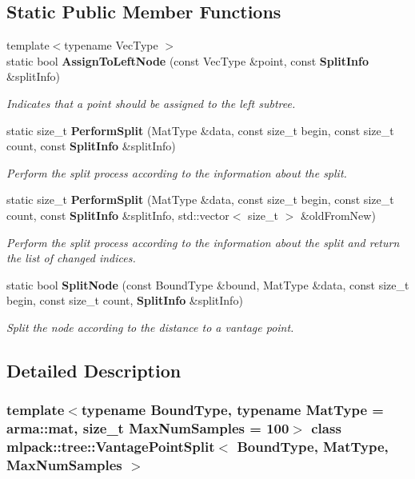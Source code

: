\subsection*{Static Public Member Functions}
\begin{DoxyCompactItemize}
\item 
{\footnotesize template$<$typename Vec\+Type $>$ }\\static bool \textbf{ Assign\+To\+Left\+Node} (const Vec\+Type \&point, const \textbf{ Split\+Info} \&split\+Info)
\begin{DoxyCompactList}\small\item\em Indicates that a point should be assigned to the left subtree. \end{DoxyCompactList}\item 
static size\+\_\+t \textbf{ Perform\+Split} (Mat\+Type \&data, const size\+\_\+t begin, const size\+\_\+t count, const \textbf{ Split\+Info} \&split\+Info)
\begin{DoxyCompactList}\small\item\em Perform the split process according to the information about the split. \end{DoxyCompactList}\item 
static size\+\_\+t \textbf{ Perform\+Split} (Mat\+Type \&data, const size\+\_\+t begin, const size\+\_\+t count, const \textbf{ Split\+Info} \&split\+Info, std\+::vector$<$ size\+\_\+t $>$ \&old\+From\+New)
\begin{DoxyCompactList}\small\item\em Perform the split process according to the information about the split and return the list of changed indices. \end{DoxyCompactList}\item 
static bool \textbf{ Split\+Node} (const Bound\+Type \&bound, Mat\+Type \&data, const size\+\_\+t begin, const size\+\_\+t count, \textbf{ Split\+Info} \&split\+Info)
\begin{DoxyCompactList}\small\item\em Split the node according to the distance to a vantage point. \end{DoxyCompactList}\end{DoxyCompactItemize}


\subsection{Detailed Description}
\subsubsection*{template$<$typename Bound\+Type, typename Mat\+Type = arma\+::mat, size\+\_\+t Max\+Num\+Samples = 100$>$\newline
class mlpack\+::tree\+::\+Vantage\+Point\+Split$<$ Bound\+Type, Mat\+Type, Max\+Num\+Samples $>$}

